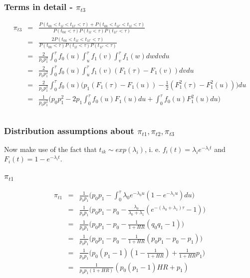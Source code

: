 \documentclass[xcolor=pdftex,dvipsnames,table]{beamer}
\begin{document}
\begin{frame} %
\frametitle{Terms in detail - $\pi_{t3}$}
\begin{eqnarray*}
\pi_{t3} & = &\frac{P(t_{0k}  < t_{1l} < t_{1l'} < \tau) + P(t_{0k}  < t_{1l'} < t_{1l} < \tau)}{P(t_{0k} < \tau)P(t_{1l} < \tau)P(t_{1l'} < \tau)} \\
& = & \frac{2 P(t_{0k}  < t_{1l} < t_{1l'} < \tau)}{P(t_{0k} < \tau)P(t_{1l} < \tau)P(t_{1l'} < \tau)} \\
& = & \frac{2}{p_0 p_1^2}\int_0^\tau f_0(u) \int_u^\tau f_1(v) \int_v^\tau f_1(w) dw dv du \\
& = & \frac{2}{p_0 p_1^2}\int_0^\tau f_0(u) \int_u^\tau f_1(v) (F_1(\tau) - F_1(v)) dv du \\
& = & \frac{2}{p_0 p_1^2}\int_0^\tau f_0(u) \Big(p_1 (F_1(\tau) - F_1(u)) - \frac{1}{2}(F_1^2(\tau) - F_1^2(u)) \Big)du \\
& = & \frac{1}{p_0 p_1^2}\Big(p_0 p_1^2 - 2 p_1 \int_0^\tau f_0(u) F_1(u) du +  \int_0^\tau f_0(u) F_1^2(u) du \Big) \\
\\
\end{eqnarray*}
\end{frame}

\begin{frame} %
\frametitle{Distribution assumptions about $\pi_{t1}, \pi_{t2}, \pi_{t3}$}
Now make use of the fact that $t_{ik} \sim exp(\lambda_i)$, i. e. $f_i(t) = \lambda_i e^{-\lambda_i t}$ and 
$F_i(t) = 1- e^{-\lambda_i t}$.
\end{frame}

\begin{frame} %
\frametitle{$\pi_{t1}$}
\begin{eqnarray*} 
\pi_{t1} & = & \frac{1}{p_0 p_1}\Big( p_0 p_1 - \int_0^\tau \lambda_0 e^{-\lambda_0 u} (1- e^{-\lambda_1 u})du \Big) \\
& = & \frac{1}{p_0 p_1}\Big( p_0 p_1 - p_0 - \frac{\lambda_0}{\lambda_0 + \lambda_1} ( e^{-(\lambda_0 + \lambda_1)\tau}  - 1) \Big) \\
& = & \frac{1}{p_0 p_1}\Big( p_0 p_1 - p_0 - \frac{1}{1 + \mathit{HR}} ( q_0 q_1  - 1) \Big) \\
& = & \frac{1}{p_0 p_1}\Big( p_0 p_1 - p_0 - \frac{1}{1 + \mathit{HR}} ( p_0 p_1  - p_0 - p_1)\Big) \\
& = & \frac{1}{p_0 p_1}\Big(p_0 (p_1 - 1)(1-\frac{1}{1+\mathit{HR}}) + \frac{1}{1+\mathit{HR}} p_1 \Big) \\
& = & \frac{1}{p_0 p_1(1+\mathit{HR})}(p_0 (p_1 - 1)\mathit{HR} + p_1) \\
\\
\end{eqnarray*}
\end{frame}
\end{document}
